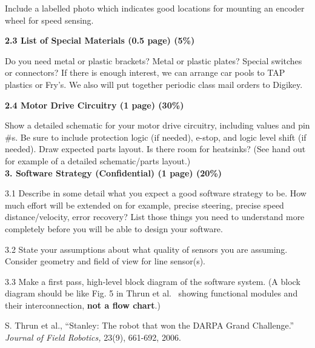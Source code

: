 \documentclass[10pt]{article}
\begin{document}
Include a labelled photo which indicates good locations for mounting
an encoder wheel for speed sensing.


{\bf 2.3 List of Special Materials (0.5 page) (5\%)}

Do you need metal or plastic
brackets? Metal or plastic plates?  Special switches or connectors? If
there is enough interest, we can arrange car pools to TAP plastics or
Fry's. We also will put together periodic class mail orders to Digikey.

{\bf 2.4 Motor Drive Circuitry (1 page) (30\%)}

Show a detailed schematic for your motor drive circuitry, including values and
pin \#s. Be sure to include protection logic (if needed), e-stop, and
logic level shift (if needed).
Draw expected parts layout. Is there room for heatsinks?
(See hand out for example of a detailed schematic/parts layout.)\\

{\bf 3. Software Strategy (Confidential) (1 page) (20\%)}


3.1 Describe in some detail what you expect a good software strategy to be.
How much effort will be extended on for example, precise steering,
precise speed distance/velocity, error recovery? List those things you need
to understand more completely before you will be able to design
your software. 

3.2 State your assumptions about what quality of sensors
you are assuming. Consider geometry and field of view for line sensor(s).

3.3 Make a first pass, high-level block diagram of
the software system. (A block diagram should be like Fig. 5
in Thrun et al.~\cite{Thrun06} showing
functional modules and their interconnection, {\bf not a flow chart}.) 

\begin{small}

\begin{thebibliography}{10}
{
S. Thrun et al.,
``Stanley: The robot that won the DARPA Grand Challenge.''
{\em Journal of Field Robotics,} 23(9), 661-692, 2006.
}
\end{thebibliography}
\end{small} 
\end{document}
